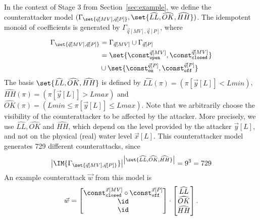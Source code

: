 {\begin{example}
  \label{ex:counterattack}
  In the context of Stage 3 from Section~\ref{sec:example}, we define the counterattacker model $(\Gamma_{\set{\vec{q}[MV],\vec{q}[P]}},\set{\widehat{LL},\widehat{OK},\widehat{HH}})$. The idempotent monoid of coefficients is generated by $\Gamma_{\vec{q}[MV],\vec{q}[P]}$, where 
  \begin{align*}
    \Gamma_{\set{\vec{q}[MV],\vec{q}[P]}}&=\Gamma_{\vec{q}[MV]}\cup\Gamma_{\vec{q}[P]}\\
    &=\set{\const^{\vec{q}[MV]}_{\texttt{open}},\const^{\vec{q}[MV]}_{\texttt{closed}}}\\
    &\cup \set{\const^{\vec{q}[P]}_{\texttt{on}},\const^{\vec{q}[P]}_{\texttt{off}}}
  \end{align*}
  The basis $\set{\widehat{LL},\widehat{OK},\widehat{HH}}$ is defined by  $\widehat{LL}(\pi)=(\pi[\vec{y}[L]]<Lmin)$, $\widehat{HH}(\pi)=(\pi[\vec{y}[L]]>Lmax)$ and $\widehat{OK}(\pi)=(Lmin\leq \pi[\vec{y}[L]]\leq Lmax)$. Note that we arbitrarily choose the visibility of the counterattacker to be affected by the attacker. More precisely, we use $\widehat{LL},\widehat{OK}$ and $\widehat{HH}$, which depend on the level provided by the attacker $\vec{y}[L]$, and not on the physical (real) water level $\vec{x}[L]$. 
  This counterattacker model generates 729 different counterattacks, 
since
\begin{align*}
  \left| \IM{\Gamma_{\set{\vec{q}[MV],\vec{q}[P]}}}\right|^{\left|\set{\widehat{LL},\widehat{OK},\widehat{HH}}\right|}=9^3=729
\end{align*}
  An example counterattack $\vec{w}$ from this model is 
  \begin{align}
    \vec{w}=
    \begin{bmatrix}
      \const^{\vec{x}[MV]}_{\texttt{closed}} \circ \const^{\vec{x}[P]}_{\texttt{off}} \\
      \id \\
      \id
    \end{bmatrix}
    \cdot
    \begin{bmatrix}
      \widehat{LL} \\
      \widehat{OK}\\
      \widehat{HH}
    \end{bmatrix}.
  \end{align}
\end{example}

}

